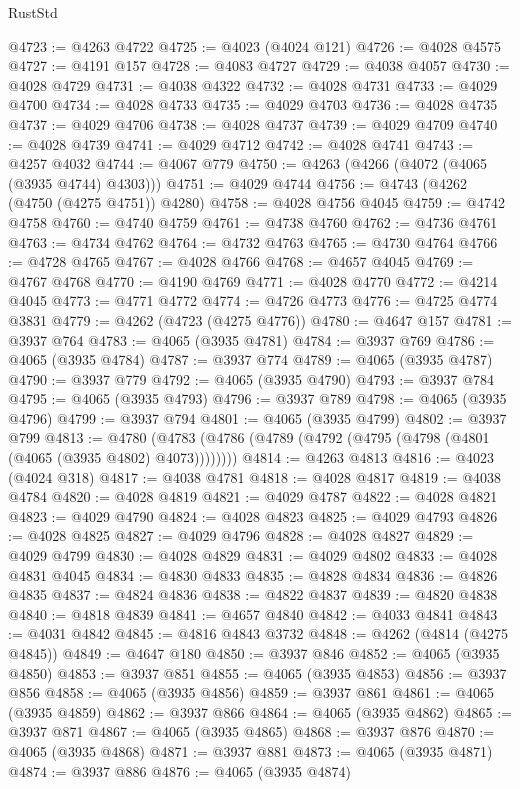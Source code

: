 \begin{lexlean}{RustStd}
\begin{coremodule}
@4723 := @4263 @4722
@4725 := @4023 (@4024 @121)
@4726 := @4028 @4575
@4727 := @4191 @157
@4728 := @4083 @4727
@4729 := @4038 @4057
@4730 := @4028 @4729
@4731 := @4038 @4322
@4732 := @4028 @4731
@4733 := @4029 @4700
@4734 := @4028 @4733
@4735 := @4029 @4703
@4736 := @4028 @4735
@4737 := @4029 @4706
@4738 := @4028 @4737
@4739 := @4029 @4709
@4740 := @4028 @4739
@4741 := @4029 @4712
@4742 := @4028 @4741
@4743 := @4257 @4032
@4744 := @4067 @779
@4750 := @4263 (@4266 (@4072 (@4065 (@3935 @4744) @4303)))
@4751 := @4029 @4744
@4756 := @4743 (@4262 (@4750 (@4275 @4751)) @4280)
@4758 := @4028 @4756 @4045
@4759 := @4742 @4758
@4760 := @4740 @4759
@4761 := @4738 @4760
@4762 := @4736 @4761
@4763 := @4734 @4762
@4764 := @4732 @4763
@4765 := @4730 @4764
@4766 := @4728 @4765
@4767 := @4028 @4766
@4768 := @4657 @4045
@4769 := @4767 @4768
@4770 := @4190 @4769
@4771 := @4028 @4770
@4772 := @4214 @4045
@4773 := @4771 @4772
@4774 := @4726 @4773
@4776 := @4725 @4774 @3831
@4779 := @4262 (@4723 (@4275 @4776))
@4780 := @4647 @157
@4781 := @3937 @764
@4783 := @4065 (@3935 @4781)
@4784 := @3937 @769
@4786 := @4065 (@3935 @4784)
@4787 := @3937 @774
@4789 := @4065 (@3935 @4787)
@4790 := @3937 @779
@4792 := @4065 (@3935 @4790)
@4793 := @3937 @784
@4795 := @4065 (@3935 @4793)
@4796 := @3937 @789
@4798 := @4065 (@3935 @4796)
@4799 := @3937 @794
@4801 := @4065 (@3935 @4799)
@4802 := @3937 @799
@4813 := @4780 (@4783 (@4786 (@4789 (@4792 (@4795 (@4798 (@4801 (@4065 (@3935 @4802) @4073))))))))
@4814 := @4263 @4813
@4816 := @4023 (@4024 @318)
@4817 := @4038 @4781
@4818 := @4028 @4817
@4819 := @4038 @4784
@4820 := @4028 @4819
@4821 := @4029 @4787
@4822 := @4028 @4821
@4823 := @4029 @4790
@4824 := @4028 @4823
@4825 := @4029 @4793
@4826 := @4028 @4825
@4827 := @4029 @4796
@4828 := @4028 @4827
@4829 := @4029 @4799
@4830 := @4028 @4829
@4831 := @4029 @4802
@4833 := @4028 @4831 @4045
@4834 := @4830 @4833
@4835 := @4828 @4834
@4836 := @4826 @4835
@4837 := @4824 @4836
@4838 := @4822 @4837
@4839 := @4820 @4838
@4840 := @4818 @4839
@4841 := @4657 @4840
@4842 := @4033 @4841
@4843 := @4031 @4842
@4845 := @4816 @4843 @3732
@4848 := @4262 (@4814 (@4275 @4845))
@4849 := @4647 @180
@4850 := @3937 @846
@4852 := @4065 (@3935 @4850)
@4853 := @3937 @851
@4855 := @4065 (@3935 @4853)
@4856 := @3937 @856
@4858 := @4065 (@3935 @4856)
@4859 := @3937 @861
@4861 := @4065 (@3935 @4859)
@4862 := @3937 @866
@4864 := @4065 (@3935 @4862)
@4865 := @3937 @871
@4867 := @4065 (@3935 @4865)
@4868 := @3937 @876
@4870 := @4065 (@3935 @4868)
@4871 := @3937 @881
@4873 := @4065 (@3935 @4871)
@4874 := @3937 @886
@4876 := @4065 (@3935 @4874)

\end{coremodule}
\end{lexlean}
